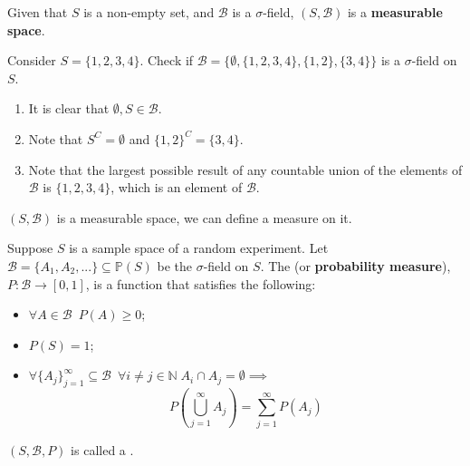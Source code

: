 \documentclass[notoc,notitlepage]{tufte-book}
\begin{document}
\begin{defn}\label{defn:measurable_space}
  Given that $S$ is a non-empty set, and $\mathscr{B}$ is a $\sigma$-field, $(S, \mathscr{B})$ is a \textbf{measurable space}.
\end{defn}

\begin{eg}
  \label{eg:sigma_field_eg}
  Consider $S = \{1, 2, 3, 4\}$. Check if $\mathscr{B} = \{\emptyset, \{1, 2, 3, 4\}, \{1, 2\}, \{3, 4\} \}$ is a $\sigma$-field on $S$.
  \begin{enumerate}
    \item It is clear that $\emptyset, S \in \mathscr{B}$.
    \item Note that $S^C = \emptyset$ and $\{1, 2\}^C = \{3, 4\}$.
    \item Note that the largest possible result of any countable union of the elements of $\mathscr{B}$ is $\{1, 2, 3, 4\}$, which is an element of $\mathscr{B}$.
  \end{enumerate}
\end{eg}

 $(S, \mathscr{B})$ is a measurable space, we can define a measure on it.

\begin{defn}\label{defn:probability_measure}
  Suppose $S$ is a sample space of a random experiment. Let $\mathscr{B} = \{A_1, A_2, ...\} \subseteq \mathbb{P}(S)$ be the $\sigma$-field on $S$. The  (or \textbf{probability measure}), $P : \mathscr{B} \to [0, 1]$, is a function that satisfies the following:
  \begin{itemize}
    \item $\forall A \in \mathscr{B} \enspace P(A) \geq 0$;
    \item $P(S) = 1$;
    \item $\forall \{A_j\}_{j = 1}^{\infty} \subseteq \mathscr{B} \enspace \forall i \neq j \in \mathbb{N} \; A_i \cap A_j = \emptyset \implies$
      \begin{equation}\label{eq:probability_of_union_of_disjoint_sets}
        P \left( \bigcup_{j=1}^{\infty} A_j \right) = \sum_{j=1}^{\infty} P(A_j)
      \end{equation}
  \end{itemize}
  $(S, \mathscr{B}, P)$ is called a .
\end{defn}
\end{document}
